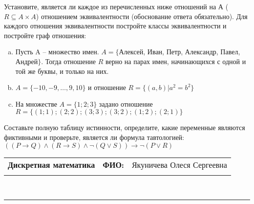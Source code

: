 \documentclass[10pt]{exam}
\newcommand{\class}{Дискретная математика}
\newcommand{\examdate}{}
\begin{document}
\begin{questions}
\question
Установите, является ли каждое из перечисленных ниже отношений на А ($R \subseteq A \times A$) отношением эквивалентности (обоснование ответа обязательно). Для каждого отношения эквивалентности постройте классы 
эквивалентности и постройте граф отношения:
\begin{enumerate} [a)]\setcounter{enumi}{0}
\item Пусть A – множество имен. $A = \{ $Алексей, Иван, Петр, Александр, Павел, Андрей$ \}$. Тогда отношение $R$ верно на парах имен, начинающихся с одной и той же буквы, и только на них.
\item $A = \{-10, -9, … , 9, 10\}$ и отношение $ R = \{(a,b)|a^{2} = b^{2}\}$
\item На множестве $A = \{1; 2; 3\}$ задано отношение $R = \{(1; 1); (2; 2); (3; 3); (3; 2); (1; 2); (2; 1)\}$
\end{enumerate}\question Составьте полную таблицу истинности, определите, какие переменные являются фиктивными и проверьте, является ли формула тавтологией:
$((P \rightarrow Q) \land (R \rightarrow S) \land \neg (Q \lor S)) \rightarrow \neg (P \lor R)$

\end{questions}
\newpage
\begin{flushright}
\begin{tabular}{p{2.8in} r l}
\textbf{\class} & \textbf{ФИО:} &Якуничева Олеся Сергеевна
\\

\textbf{\examdate} &&\\
\end{tabular}\\
\end{flushright}
\rule[1ex]{\textwidth}{.1pt}
\end{document}
